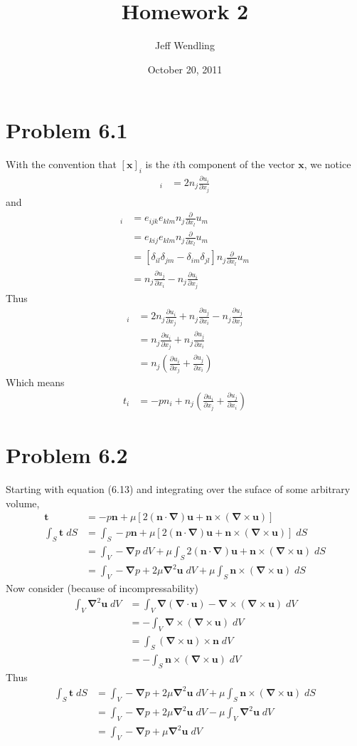 \documentclass[12pt]{article}
\title{Homework 2}
\author{Jeff Wendling}
\date{October 20, 2011}
\newcommand{\eq}[1]{\begin{align*}#1\end{align*}}
\newcommand{\p}[2]{\frac{\partial#1}{\partial#2}}
\newcommand{\n}{\bm{\nabla}}
\newcommand{\cross}{\times}
\newcommand{\tc}[3]{#1\times(#2\times#3)}
\begin{document}
\maketitle
\section*{Problem 6.1} With the convention that $[\bm{x}]_i$ is the $i$th
component of the vector $\bm{x}$, we notice
\eq{
	[2(\bm{n} \cdot \n)\bm{u}]_i &= 2n_j\p{u_i}{x_j}
}
and
\eq{
	[\tc{\bm{n}}{\n}{\bm{u}}]_i &= e_{ijk}e_{klm}n_j\p{}{x_l}u_m\\
	&= e_{kij}e_{klm}n_j\p{}{x_l}u_m\\
	&= [\delta_{il}\delta_{jm} - \delta_{im}\delta_{jl}]n_j\p{}{x_l}u_m\\
	&= n_j\p{u_j}{x_i} - n_j\p{u_i}{x_j}
}
Thus
\eq{
	[2(\bm{n} \cdot \n)\bm{u} + \bm{n} \cross (\n \cross \bm{u})]_i &= 2n_j\p{u_i}{x_j} + n_j\p{u_j}{x_i} - n_j\p{u_j}{x_j}\\
	&= n_j\p{u_i}{x_j} + n_j\p{u_j}{x_i}\\
	&= n_j(\p{u_i}{x_j} + \p{u_j}{x_i})
}
Which means
\eq{
	t_i &= -pn_i + n_j(\p{u_i}{x_j} + \p{u_j}{x_i})
}
\section*{Problem 6.2} Starting with equation (6.13) and integrating over the suface of some arbitrary volume,
\eq{
	\bm{t} &= -p\bm{n} + \mu[2(\bm{n}\cdot\n)\bm{u} + \tc{\bm{n}}{\n}{\bm{u}}]\\
	\int_S \bm{t} \;dS &= \int_S -p\bm{n} + \mu[2(\bm{n}\cdot\n)\bm{u} + \tc{\bm{n}}{\n}{\bm{u}}] \;dS\\
	&= \int_V -\n p \;dV + \mu \int_S 2(\bm{n}\cdot\n)\bm{u} + \tc{\bm{n}}{\n}{\bm{u}} \;dS\\
	&= \int_V -\n p + 2\mu\n^2 \bm{u} \;dV + \mu\int_S \tc{\bm{n}}{\n}{\bm{u}} \;dS
}
Now consider (because of incompressability)
\eq{
	\int_V \n^2 \bm u \;dV &= \int_V \n(\n\cdot\bm{u}) - \tc{\n}{\n}{\bm{u}} \;dV\\
	&= -\int_V \tc{\n}{\n}{\bm{u}} \;dV\\
	&= \int_S (\n \times \bm{u}) \times \bm{n} \;dV\\
	&= -\int_S \tc{\bm{n}}{\n}{\bm{u}} \;dV
}
Thus
\eq{
	\int_S \bm{t} \;dS &= \int_V -\n p + 2\mu\n^2 \bm{u} \;dV + \mu\int_S \tc{\bm{n}}{\n}{\bm{u}} \;dS\\
	&= \int_V -\n p + 2\mu\n^2 \bm{u} \;dV - \mu\int_V \n^2 \bm u \;dV\\
	&= \int_V -\n p + \mu\n^2 \bm{u} \;dV
}
\end{document}
